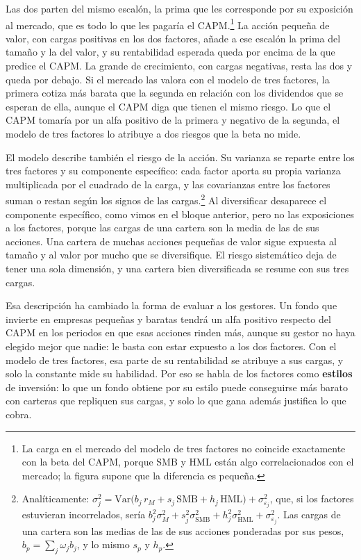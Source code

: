 \documentclass[10pt,a4paper]{article}
\begin{document}
Las dos parten del mismo escalón, la prima que les corresponde por su exposición al mercado, que es todo lo que les pagaría el CAPM.\footnote{%
    La carga en el mercado del modelo de tres factores no coincide exactamente con la beta del CAPM, porque SMB y HML están algo correlacionados con el mercado; la figura supone que la diferencia es pequeña.
} La acción pequeña de valor, con cargas positivas en los dos factores, añade a ese escalón la prima del tamaño y la del valor, y su rentabilidad esperada queda por encima de la que predice el CAPM. La grande de crecimiento, con cargas negativas, resta las dos y queda por debajo. Si el mercado las valora con el modelo de tres factores, la primera cotiza más barata que la segunda en relación con los dividendos que se esperan de ella, aunque el CAPM diga que tienen el mismo riesgo. Lo que el CAPM tomaría por un alfa positivo de la primera y negativo de la segunda, el modelo de tres factores lo atribuye a dos riesgos que la beta no mide.

El modelo describe también el riesgo de la acción. Su varianza se reparte entre los tres factores y su componente específico: cada factor aporta su propia varianza multiplicada por el cuadrado de la carga, y las covarianzas entre los factores suman o restan según los signos de las cargas.\footnote{%
    Analíticamente: $\sigma_j^2=\mathrm{Var}\big(b_j\,r_M+s_j\,\text{SMB}+h_j\,\text{HML}\big)+\sigma_{\varepsilon_j}^2$, que, si los factores estuvieran incorrelados, sería $b_j^2\sigma_M^2+s_j^2\sigma_{\text{SMB}}^2+h_j^2\sigma_{\text{HML}}^2+\sigma_{\varepsilon_j}^2$. Las cargas de una cartera son las medias de las de sus acciones ponderadas por sus pesos, $b_p=\sum_j\omega_j b_j$, y lo mismo $s_p$ y $h_p$.
} Al diversificar desaparece el componente específico, como vimos en el bloque anterior, pero no las exposiciones a los factores, porque las cargas de una cartera son la media de las de sus acciones. Una cartera de muchas acciones pequeñas de valor sigue expuesta al tamaño y al valor por mucho que se diversifique. El riesgo sistemático deja de tener una sola dimensión, y una cartera bien diversificada se resume con sus tres cargas.

Esa descripción ha cambiado la forma de evaluar a los gestores. Un fondo que invierte en empresas pequeñas y baratas tendrá un alfa positivo respecto del CAPM en los periodos en que esas acciones rinden más, aunque su gestor no haya elegido mejor que nadie: le basta con estar expuesto a los dos factores. Con el modelo de tres factores, esa parte de su rentabilidad se atribuye a sus cargas, y solo la constante mide su habilidad. Por eso se habla de los factores como \textbf{estilos} de inversión: lo que un fondo obtiene por su estilo puede conseguirse más barato con carteras que repliquen sus cargas, y solo lo que gana además justifica lo que cobra.
\end{document}
